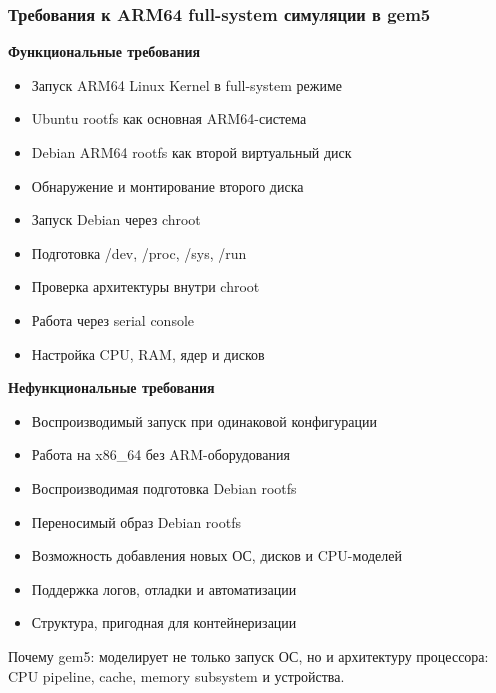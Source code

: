 \documentclass{beamer}
\begin{document}
\begin{frame}[shrink=10]
\frametitle{Требования к ARM64 full-system симуляции в gem5}

\textbf{Функциональные требования}
\begin{itemize}
    \item Запуск ARM64 Linux Kernel в full-system режиме
    \item Ubuntu rootfs как основная ARM64-система
    \item Debian ARM64 rootfs как второй виртуальный диск
    \item Обнаружение и монтирование второго диска
    \item Запуск Debian через chroot
    \item Подготовка /dev, /proc, /sys, /run
    \item Проверка архитектуры внутри chroot
    \item Работа через serial console
    \item Настройка CPU, RAM, ядер и дисков
\end{itemize}

\textbf{Нефункциональные требования}
\begin{itemize}
    \item Воспроизводимый запуск при одинаковой конфигурации
    \item Работа на x86\_64 без ARM-оборудования
    \item Воспроизводимая подготовка Debian rootfs
    \item Переносимый образ Debian rootfs
    \item Возможность добавления новых ОС, дисков и CPU-моделей
    \item Поддержка логов, отладки и автоматизации
    \item Структура, пригодная для контейнеризации
\end{itemize}

Почему gem5: моделирует не только запуск ОС, но и архитектуру процессора: CPU pipeline, cache, memory subsystem и устройства.
\end{frame}
\end{document}

